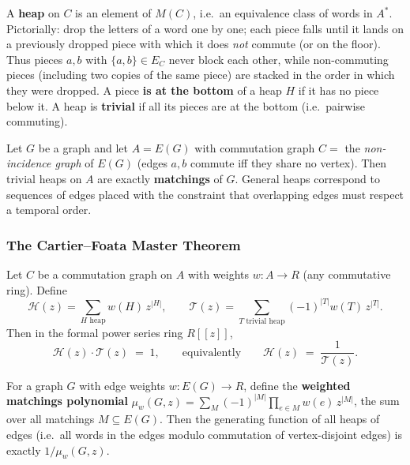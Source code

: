 \begin{definition}
A \textbf{heap} on $C$ is an element of $M(C)$, i.e.\ an equivalence
class of words in $A^*$. Pictorially: drop the letters of a word one by
one; each piece falls until it lands on a previously dropped piece with
which it does \emph{not} commute (or on the floor). Thus pieces $a, b$
with $\{a, b\} \in E_C$ never block each other, while non-commuting
pieces (including two copies of the same piece) are stacked in the
order in which they were dropped. A piece
\textbf{is at the bottom} of a heap $H$ if it has no piece below it.
A heap is \textbf{trivial} if all its pieces are at the bottom (i.e.\
pairwise commuting).
\end{definition}

\begin{example}
Let $G$ be a graph and let $A = E(G)$ with commutation graph
$C = $ the \emph{non-incidence graph} of $E(G)$ (edges $a, b$
commute iff they share no vertex). Then trivial heaps on $A$ are
exactly \textbf{matchings} of $G$. General heaps correspond to
sequences of edges placed with the constraint that overlapping edges
must respect a temporal order.
\end{example}

\subsubsection{The Cartier--Foata Master Theorem}

\begin{theorem}\label{thm:cartierfoata}
Let $C$ be a commutation graph on $A$ with weights $w : A \to R$
(any commutative ring). Define
\[
  \mathcal H(z) = \sum_{H \text{ heap}} w(H)\, z^{|H|},
  \qquad
  \mathcal T(z) = \sum_{T \text{ trivial heap}} (-1)^{|T|} w(T)\, z^{|T|}.
\]
Then in the formal power series ring $R[[z]]$,
\[
  \mathcal H(z) \cdot \mathcal T(z) \;=\; 1,
  \qquad\text{equivalently}\qquad
  \mathcal H(z) \;=\; \frac{1}{\mathcal T(z)}.
\]
\end{theorem}

\begin{corollary}\label{cor:viennot}
For a graph $G$ with edge weights $w : E(G) \to R$, define the
\textbf{weighted matchings polynomial}
$\mu_w(G, z) = \sum_M (-1)^{|M|} \prod_{e \in M} w(e)\, z^{|M|}$,
the sum over all matchings $M \subseteq E(G)$. Then the generating
function of all heaps of edges (i.e.\ all words in the edges modulo
commutation of vertex-disjoint edges) is exactly $1 / \mu_w(G, z)$.
\end{corollary}

